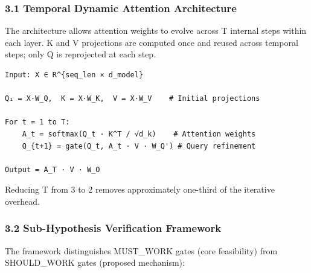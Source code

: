 
\subsubsection{3.1 Temporal Dynamic Attention Architecture}

The architecture allows attention weights to evolve across T internal steps within each layer. K and V projections are computed once and reused across temporal steps; only Q is reprojected at each step.

\begin{verbatim}
Input: X ∈ R^{seq_len × d_model}

Q₁ = X·W_Q,  K = X·W_K,  V = X·W_V    # Initial projections

For t = 1 to T:
    A_t = softmax(Q_t · K^T / √d_k)    # Attention weights
    Q_{t+1} = gate(Q_t, A_t · V · W_Q') # Query refinement

Output = A_T · V · W_O
\end{verbatim}

Reducing T from 3 to 2 removes approximately one-third of the iterative overhead.

\subsubsection{3.2 Sub-Hypothesis Verification Framework}

The framework distinguishes MUST\_WORK gates (core feasibility) from SHOULD\_WORK gates (proposed mechanism):

\begin{table}[htbp]
\centering
{}
\end{table}

